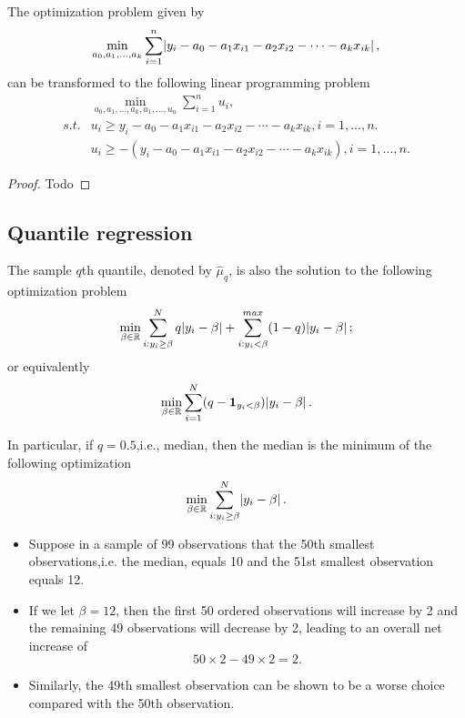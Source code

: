 \begin{refsection}
\begin{lemma}
The optimization problem given by
$$\min_{a_0,a_1,...,a_k} \sum_{i=1}^{n} \abs{y_i - a_0 - a_1 x_{i1} - a_2 x_{i2} - \cdots -a_k x_{ik}},$$
can be transformed to the following linear programming problem
\begin{align*}
&\min_{a_0,a_1,...,a_k, u_1,...,u_n} \sum_{i=1}^{n} u_i ,\\
s.t. & u_i \geq y_i - a_0 -a_1x_{i1} -a_2x_{i2} - \cdots -a_kx_{ik}, i=1,...,n. \\
& u_i \geq -(y_i - a_0 -a_1x_{i1} -a_2x_{i2} - \cdots -a_kx_{ik}), i=1,...,n. 
\end{align*}
\end{lemma}
\begin{proof}
Todo
\end{proof}


\subsection{Quantile regression}

\begin{lemma}\cite[87]{cameron2005microeconometrics} 
The sample $q$th quantile, denoted by $\hat{\mu}_q$, is also the solution to the following optimization problem
$$\min_{\beta \in \mathbb{R}} \sum_{i:y_i\geq \beta}^{N} q\abs{y_i-\beta} + \sum_{i:y_i < \beta}^{max}(1-q)\abs{y_i-\beta};$$
or equivalently
$$\min_{\beta \in \mathbb{R}} \sum_{i=1}^{N} (q-\bm{1}_{y_i<\beta})\abs{y_i-\beta}.$$

In particular, if $q=0.5$,i.e., median, then the median is the minimum of the following optimization
$$\min_{\beta \in \mathbb{R}} \sum_{i:y_i\geq \beta}^{N} \abs{y_i-\beta}.$$
\end{lemma}


\begin{remark}\hfill
\begin{itemize}
	\item 
	Suppose in a sample of 99 observations that the 50th smallest observations,i.e. the median, equals 10 and the 51st smallest observation equals 12. 
	\item 
	If we let $\beta = 12$, then the first 50 ordered observations will increase by 2 and the remaining 49 observations will decrease by 2, leading to an overall net increase of $$50\times 2 - 49\times 2 = 2.$$
	\item Similarly, the 49th smallest observation can be shown to be a worse choice compared with the 50th observation.
\end{itemize}	 	
\end{remark}


\end{refsection}
